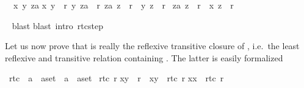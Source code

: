 \begin{isabellebody}
\begin{isamarkuptxt}
\begin{isabelle}
\ {}{\isachardot}\ {\isasymAnd}x\ y\ za{\isachardot}\isanewline
{}x{\isacharcomma}\ y{\isacharparenright}\ {\isasymin}\ r{\isacharsemicolon}\ {\isacharparenleft}y{\isacharcomma}\ za{\isacharparenright}\ {\isasymin}\ r{\isacharasterisk}{\isacharsemicolon}\ {\isacharparenleft}za{\isacharcomma}\ z{\isacharparenright}\ {\isasymin}\ r{\isacharasterisk}\ {\isasymlongrightarrow}\ {\isacharparenleft}y{\isacharcomma}\ z{\isacharparenright}\ {\isasymin}\ r{\isacharasterisk}{\isasymrbrakk}\isanewline
{}\ {\isacharparenleft}za{\isacharcomma}\ z{\isacharparenright}\ {\isasymin}\ r{\isacharasterisk}\ {\isasymlongrightarrow}\ {\isacharparenleft}x{\isacharcomma}\ z{\isacharparenright}\ {\isasymin}\ r{\isacharasterisk}%
\end{isabelle}%
\end{isamarkuptxt}%
\isamarkuptrue%
\ \isamarkupfalse%
{\isacharparenleft}blast{\isacharparenright}\isanewline
{}\isamarkupfalse%
{\isacharparenleft}blast\ intro{\isacharcolon}\ rtc{\isacharunderscore}step{\isacharparenright}\isanewline
{}\isamarkupfalse%
%
\endisatagproof
{\isafoldproof}%
%
\isadelimproof
%
\endisadelimproof
%
\begin{isamarkuptext}%
Let us now prove that  is really the reflexive transitive closure
of , i.e.\ the least reflexive and transitive
relation containing . The latter is easily formalized%
\end{isamarkuptext}%
\isamarkuptrue%
\isamarkupfalse%
\ rtc{}\ {\isacharcolon}{\isacharcolon}\ {\isachardoublequoteopen}{\isacharparenleft}{\isacharprime}a\ {\isasymtimes}\ {\isacharprime}a{\isacharparenright}set\ {\isasymRightarrow}\ {\isacharparenleft}{\isacharprime}a\ {\isasymtimes}\ {\isacharprime}a{\isacharparenright}set{\isachardoublequoteclose}\isanewline
{}\isamarkupfalse%
\ {\isachardoublequoteopen}rtc{}\ r{\isachardoublequoteclose}\isanewline
{}\isanewline
{\isachardoublequoteopen}{\isacharparenleft}x{\isacharcomma}y{\isacharparenright}\ {\isasymin}\ r\ {\isasymLongrightarrow}\ {\isacharparenleft}x{\isacharcomma}y{\isacharparenright}\ {\isasymin}\ rtc{}\ r{\isachardoublequoteclose}\isanewline
{\isachardoublequoteopen}{\isacharparenleft}x{\isacharcomma}x{\isacharparenright}\ {\isasymin}\ rtc{}\ r{\isachardoublequoteclose}\isanewline

\end{isabellebody}

